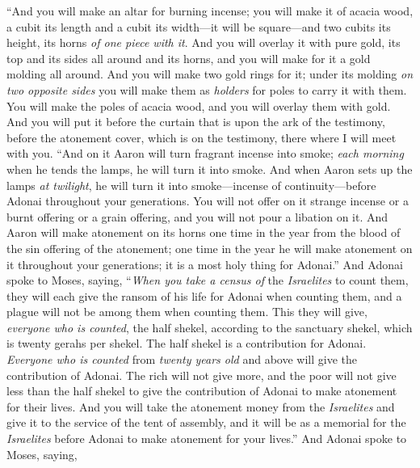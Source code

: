 \begin{biblechapter} %
 “And you will make an altar for burning incense; you will make it of acacia wood,
\verse a cubit its length and a cubit its width—it will be square—and two cubits its height, its horns \textit{of one piece with it}.
\verse And you will overlay it with pure gold, its top and its sides all around and its horns, and you will make for it a gold molding all around.
\verse And you will make two gold rings for it; under its molding \textit{on two opposite sides} you will make them as \textit{holders} for poles to carry it with them.
\verse You will make the poles of acacia wood, and you will overlay them with gold.
\verse And you will put it before the curtain that is upon the ark of the testimony, before the atonement cover, which is on the testimony, there where I will meet with you.
\verse “And on it Aaron will turn fragrant incense into smoke; \textit{each morning} when he tends the lamps, he will turn it into smoke.
\verse And when Aaron sets up the lamps \textit{at twilight}, he will turn it into smoke—incense of continuity—before Adonai throughout your generations.
\verse You will not offer on it strange incense or a burnt offering or a grain offering, and you will not pour a libation on it.
\verse And Aaron will make atonement on its horns one time in the year from the blood of the sin offering of the atonement; one time in the year he will make atonement on it throughout your generations; it is a most holy thing for Adonai.”
 And Adonai spoke to Moses, saying,
\verse “\textit{When you take a census of} the \textit{Israelites} to count them, they will each give the ransom of his life for Adonai when counting them, and a plague will not be among them when counting them.
\verse This they will give, \textit{everyone who is counted}, the half shekel, according to the sanctuary shekel, which is twenty gerahs per shekel. The half shekel is a contribution for Adonai.
\verse \textit{Everyone who is counted} from \textit{twenty years old} and above will give the contribution of Adonai.
\verse The rich will not give more, and the poor will not give less than the half shekel to give the contribution of Adonai to make atonement for their lives.
\verse And you will take the atonement money from the \textit{Israelites} and give it to the service of the tent of assembly, and it will be as a memorial for the \textit{Israelites} before Adonai to make atonement for your lives.”
 And Adonai spoke to Moses, saying,

\end{biblechapter}
